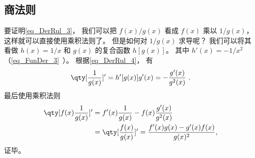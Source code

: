 \subsection{商法则}
要证明\autoref{eq_DerRul_3}， 我们可以把 $f(x)/g(x)$ 看成 $f(x)$ 乘以 $1/g(x)$， 这样就可以直接使用乘积法则了。 但是如何对 $1/g(x)$ 求导呢？ 我们可以将其看做 $h(x) = 1/x$ 和 $g(x)$ 的复合函数 $h[g(x)]$。 其中 $h'(x) = -1/x^2$（\autoref{eq_FunDer_3}~）。 根据\autoref{eq_DerRul_4}， 有
\begin{equation}
\qty[\frac{1}{g(x)}]' = h'[g(x)]g'(x) = -\frac{g'(x)}{g^2(x)}~.
\end{equation}
最后使用乘积法则
\begin{equation}
\begin{aligned}
\qty[f(x) \frac{1}{g(x)}]' &= f'(x) \frac{1}{g(x)} - f(x) \frac{g'(x)}{g^2(x)}\\
&= \qty[ \frac{f(x)}{g(x)} ]'  = \frac{f'(x)g(x) - g'(x)f(x)}{g(x)^2},
\end{aligned}
\end{equation}
证毕。
